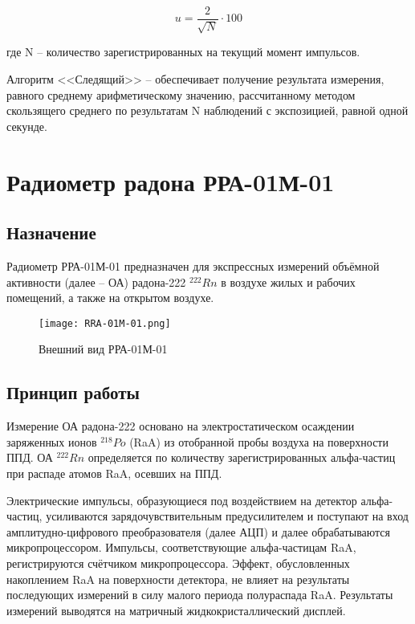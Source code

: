 	\begin{equation}
		u = \frac{2}{\sqrt{N}}\cdot 100
	\end{equation}

	где N -- количество зарегистрированных на текущий момент импульсов.

	Алгоритм <<Следящий>> -- обеспечивает получение результата измерения, 
	равного среднему арифметическому значению, рассчитанному методом 
	скользящего среднего по результатам N наблюдений с экспозицией, 
	равной одной секунде. 

\clearpage

\section{Радиометр радона РРА-01М-01} \label{sect2_4}
\subsection{Назначение} \label{subsect2_4_1}
    Радиометр РРА-01М-01 предназначен для экспрессных измерений объёмной 
    активности (далее -- ОА) радона-222 \( ^{222}Rn \) в воздухе жилых 
    и рабочих помещений, а также на открытом воздухе.

    \begin{figure}[ht]
		\centering
		\texttt{[image: RRA-01M-01.png]}
		\caption{Внешний вид РРА-01М-01}
	\end{figure}

\subsection{Принцип работы} \label{subsect2_4_3}
    Измерение ОА радона-222 основано на электростатическом осаждении 
    заряженных ионов \( ^{218}Po \) (RaA) из отобранной пробы воздуха на 
    поверхности ППД. ОА \( ^{222}Rn \) определяется по количеству 
    зарегистрированных альфа-частиц при распаде атомов RaA, осевших на 
    ППД.

    Электрические импульсы, образующиеся под воздействием на детектор 
    альфа-частиц, усиливаются зарядочувствительным предусилителем и 
    поступают на вход амплитудно-цифрового преобразователя (далее АЦП) и 
    далее обрабатываются микропроцессором. Импульсы, соответствующие 
    альфа-частицам RaA, регистрируются счётчиком микропроцессора. Эффект, 
    обусловленных накоплением RaA на поверхности детектора, не влияет на 
    результаты последующих измерений в силу малого периода полураспада 
    RaA. Результаты измерений выводятся на матричный жидкокристаллический 
    дисплей.

